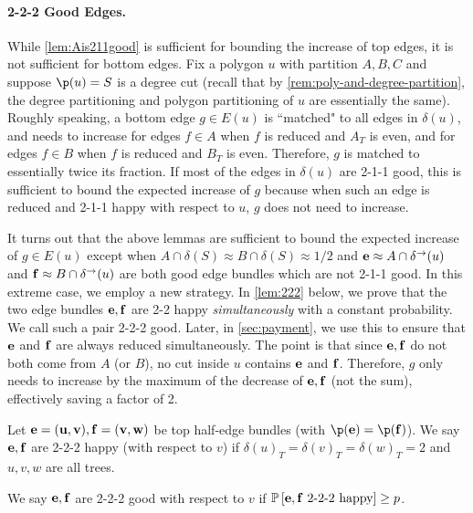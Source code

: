 \paragraph{2-2-2 Good Edges.} While \cref{lem:Ais211good} is sufficient for bounding the increase of top edges, it is not sufficient for bottom edges. Fix a polygon $u$ with partition $A,B,C$ and suppose $\p(u)=S$ is a degree cut (recall that by \cref{rem:poly-and-degree-partition}, the degree partitioning and polygon partitioning of $u$ are essentially the same). Roughly speaking, a bottom edge $g \in E(u)$ is ``matched" to all edges in $\delta(u)$, and needs to increase for edges $f \in A$ when $f$ is reduced and $A_T$ is even, and for edges $f \in B$ when $f$ is reduced and $B_T$ is even. Therefore, $g$ is matched to essentially twice its fraction. If most of the edges in $\delta(u)$ are 2-1-1 good, this is sufficient to bound the expected increase of $g$ because when such an edge is reduced and 2-1-1 happy with respect to $u$, $g$ does not need to increase. 

It turns out that the above lemmas are sufficient to bound the expected increase of $g \in E(u)$ except when $A \cap \delta(S) \approx B \cap \delta(S) \approx 1/2$ and ${\bf e} \approx A \cap \delta^\rightarrow(u)$ and ${\bf f} \approx B \cap \delta^\rightarrow(u)$ are both good edge bundles which are not 2-1-1 good. In this extreme case, we employ a new strategy. In \cref{lem:222} below, we prove that the two edge bundles ${\bf e},{\bf f}$ are 2-2 happy \textit{simultaneously} with a constant probability. We call such a pair 2-2-2 good. Later, in \cref{sec:payment}, we use this to ensure that ${\bf e}$ and ${\bf f}$ are always reduced simultaneously. The point is that since ${\bf e},{\bf f}$ do not both come from $A$ (or $B$), no cut inside $u$ contains ${\bf e}$ and ${\bf f}$. Therefore, $g$ only needs to increase by the maximum of the decrease of ${\bf e},{\bf f}$ (not the sum), effectively saving a factor of 2. 


\begin{definition}
\label{dfn:222happygood}
	Let ${\bf e}={\bf (u,v)},{\bf f}={\bf (v,w)}$ be top half-edge bundles (with $\p(\bbe)=\p(\bbf)$). We say ${\bf e},{\bf f}$ are 2-2-2 happy (with respect to $v$) if $\delta(u)_T=\delta(v)_T=\delta(w)_T=2$ and $u,v,w$ are all trees.
	
	We say ${\bf e},{\bf f}$ are 2-2-2 good with respect to $v$ if ${\mathbb{P}}\left[{\bf e},{\bf f} \text{ 2-2-2 happy}\right]\geq p$.
\end{definition}














